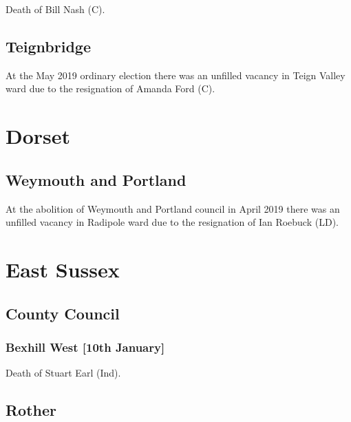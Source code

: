 \documentclass[a4paper,openany]{book}
\begin{document}
\begin{resultsiii}

Death of Bill Nash (C).

\subsection*{Teignbridge}

At the May 2019 ordinary election there was an unfilled vacancy in Teign Valley ward due to the resignation of Amanda Ford (C).

\section{Dorset}

\subsection*{Weymouth and Portland}

At the abolition of Weymouth and Portland council in April 2019 there was an unfilled vacancy in Radipole ward due to the resignation of Ian Roebuck (LD).

\section{East Sussex}

\subsection*{County Council}

\subsubsection*{Bexhill West \hspace*{\fill}\nolinebreak[1]%
	\enspace\hspace*{\fill}
	[10th January]}


Death of Stuart Earl (Ind).

\subsection*{Rother}


\end{resultsiii}
\end{document}

